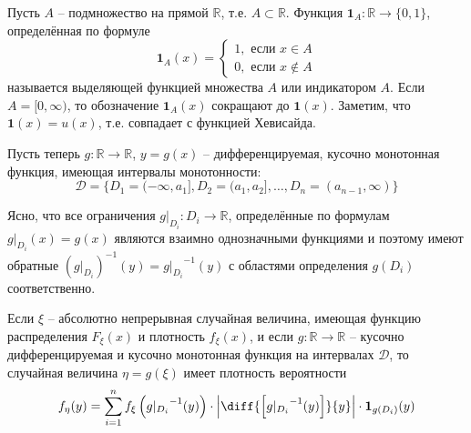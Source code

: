 \begin{definition}
\label{def:14.3}
Пусть $A$ – подмножество на прямой $\mathbb{R}$, т.е. $A \subset
\mathbb{R}$. Функция $\mathbf{1}_A :\mathbb{R} \to \{0, 1\}$, определённая по формуле
\begin{equation*}
	\mathbf{1}_A (x)=\left\{
	\begin{aligned}
		1, \text{ если } x\in A\\
		0, \text{ если } x\notin A
	\end{aligned}
	\right.
\end{equation*}
называется выделяющей функцией множества $A$ или индикатором $A$.
Если $A = [0, \infty)$, то обозначение $\mathbf{1}_A(x)$ сокращают до $\mathbf{1}(x)$. Заметим, что $\mathbf{1}(x) = u(x)$, т.е. совпадает с функцией Хевисайда.	
\end{definition}

\begin{zam}
\label{zam:14.4}
Пусть теперь $g : \mathbb{R} \to \mathbb{R}$, $y = g(x)$ -- дифференцируемая, кусочно монотонная функция, имеющая интервалы монотонности:
\begin{equation*}
	\mathcal{D}=\{D_1=(-\infty, a_1], D_2 = (a_1 , a_2 ], \ldots , D_n = (a_{n-1} , \infty)\} 
\end{equation*}

Ясно, что все ограничения $g|_{D_i} : D_i \to \mathbb{R}$, определённые по формулам $g|_{D_i}(x)=g(x)$ являются взаимно однозначными функциями и поэтому имеют обратные $\left(g|_{D_i}\right)^{-1}(y)={g|_{D_i}}^{-1}(y)$ с областями определения $g(D_i)$ соответственно.
\end{zam}

\begin{theorem}
	\label{th:14.5}
Если $\xi $ -- абсолютно непрерывная случайная величина, имеющая функцию распределения $F_\xi (x)$ и плотность $f_\xi (x)$, и если $g : \mathbb{R} \to \mathbb{R}$ -- кусочно дифференцируемая и кусочно монотонная функция на интервалах $\mathcal{D}$, то случайная величина $\eta = g(\xi)$ имеет плотность вероятности
\begin{equation*}
	f_\eta(y)=\sum\limits_{i=1}^n f_\xi\left(
		{g|_{D_i}}^{-1}(y)
	\right)\cdot
	\left|
		\diff{\left[ {g|_{D_i}}^{-1}(y) \right]}{y}
	\right|\cdot\mathbf{1}_{g(D_i)}(y)
\end{equation*}

\end{theorem}
